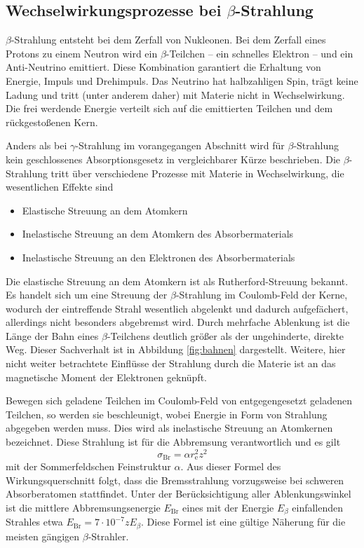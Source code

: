 \subsection{Wechselwirkungsprozesse bei \texorpdfstring{$\beta$}{Beta}-Strahlung}
\label{sec:beta}
$\beta$-Strahlung entsteht bei dem Zerfall von Nukleonen.
Bei dem Zerfall eines Protons zu einem Neutron wird ein $\beta$-Teilchen -- ein schnelles Elektron -- und ein Anti-Neutrino emittiert.
Diese Kombination garantiert die Erhaltung von Energie, Impuls und Drehimpuls.
Das Neutrino hat halbzahligen Spin, trägt keine Ladung und tritt (unter anderem daher) mit Materie nicht in Wechselwirkung.
Die frei werdende Energie verteilt sich auf die emittierten Teilchen und dem rückgestoßenen Kern.

Anders als bei $\gamma$-Strahlung im vorangegangen Abschnitt wird für  $\beta$-Strahlung kein geschlossenes Absorptionsgesetz in vergleichbarer Kürze beschrieben.
Die $\beta$-Strahlung tritt über verschiedene Prozesse mit Materie in Wechselwirkung, die wesentlichen Effekte sind
\begin{itemize}
	\item{Elastische Streuung an dem Atomkern}
	\item{Inelastische Streuung an dem Atomkern des Absorbermaterials}
	\item{Inelastische Streuung an den Elektronen des Absorbermaterials}
\end{itemize}

Die elastische Streuung an dem Atomkern ist als Rutherford-Streuung bekannt.
Es handelt sich um eine Streuung der $\beta$-Strahlung im Coulomb-Feld der Kerne, wodurch der eintreffende Strahl wesentlich abgelenkt und dadurch aufgefächert, allerdings nicht besonders abgebremst wird.
Durch mehrfache Ablenkung ist die Länge der Bahn eines $\beta$-Teilchens deutlich größer als der ungehinderte, direkte Weg.
Dieser Sachverhalt ist in Abbildung \ref{fig:bahnen} dargestellt.
Weitere, hier nicht weiter betrachtete Einflüsse der Strahlung durch die Materie ist an das magnetische Moment der Elektronen geknüpft.

Bewegen sich geladene Teilchen im Coulomb-Feld von entgegengesetzt geladenen Teilchen, so werden sie beschleunigt, 
wobei Energie in Form von Strahlung abgegeben werden muss.
Dies wird als inelastische Streuung an Atomkernen bezeichnet.
Diese Strahlung ist für die Abbremsung verantwortlich und es gilt
\begin{equation}
 	\sigma_\text{Br}=\alpha r_\text{e}^2 z^2
 \end{equation} 
mit der Sommerfeldschen Feinstruktur $\alpha$.
Aus dieser Formel des Wirkungsquerschnitt folgt, dass die Bremsstrahlung vorzugsweise bei schweren Absorberatomen stattfindet.
Unter der Berücksichtigung aller Ablenkungswinkel ist die mittlere Abbremsungsenergie $E_\text{Br}$ eines mit der Energie $E_\beta$ einfallenden Strahles etwa $E_\text{Br} = 7\cdot10^{-7}zE_\beta$.
Diese Formel ist eine gültige Näherung für die meisten gängigen $\beta$-Strahler.

